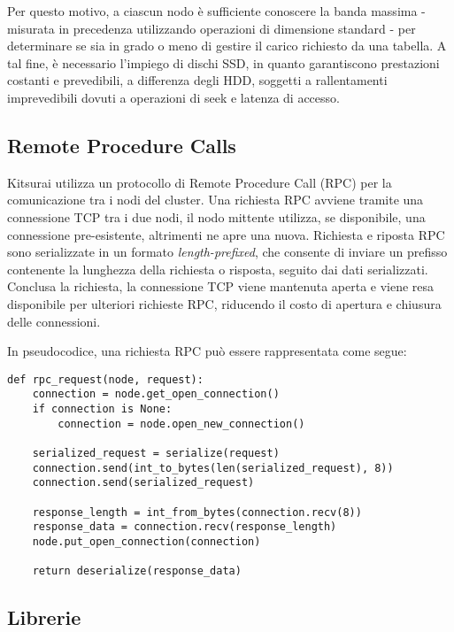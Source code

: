 Per questo motivo, a ciascun nodo è sufficiente conoscere la banda massima - misurata in precedenza utilizzando operazioni di dimensione standard - per determinare se sia in grado o meno di gestire il carico richiesto da una tabella.
A tal fine, è necessario l'impiego di dischi SSD, in quanto garantiscono prestazioni costanti e prevedibili, a differenza degli HDD, soggetti a rallentamenti imprevedibili dovuti a operazioni di seek e latenza di accesso.

\subsection{Remote Procedure Calls}
\label{subsec:rpc}

Kitsurai utilizza un protocollo di Remote Procedure Call (RPC) per la comunicazione tra i nodi del cluster.
Una richiesta RPC avviene tramite una connessione TCP tra i due nodi, il nodo mittente utilizza, se disponibile, una connessione pre-esistente, altrimenti ne apre una nuova.
Richiesta e riposta RPC sono serializzate in un formato \emph{length-prefixed}, che consente di inviare un prefisso contenente la lunghezza della richiesta o risposta, seguito dai dati serializzati.
Conclusa la richiesta, la connessione TCP viene mantenuta aperta e viene resa disponibile per ulteriori richieste RPC, riducendo il costo di apertura e chiusura delle connessioni.

In pseudocodice, una richiesta RPC può essere rappresentata come segue:
\begin{verbatim}
def rpc_request(node, request):
    connection = node.get_open_connection()
    if connection is None:
        connection = node.open_new_connection()

    serialized_request = serialize(request)
    connection.send(int_to_bytes(len(serialized_request), 8))
    connection.send(serialized_request)

    response_length = int_from_bytes(connection.recv(8))
    response_data = connection.recv(response_length)
    node.put_open_connection(connection)

    return deserialize(response_data)
\end{verbatim}

\subsection{Librerie}
\label{subsec:librerie}

